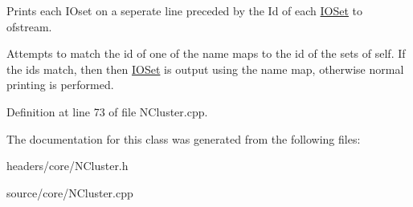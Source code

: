 Prints each IOset on a seperate line preceded by the Id of each \hyperlink{class_i_o_set}{IOSet} to ofstream. 

Attempts to match the id of one of the name maps to the id of the sets of self. If the ids match, then then \hyperlink{class_i_o_set}{IOSet} is output using the name map, otherwise normal printing is performed. 

Definition at line 73 of file NCluster.cpp.



The documentation for this class was generated from the following files:\begin{DoxyCompactItemize}
\item 
headers/core/NCluster.h\item 
source/core/NCluster.cpp\end{DoxyCompactItemize}
